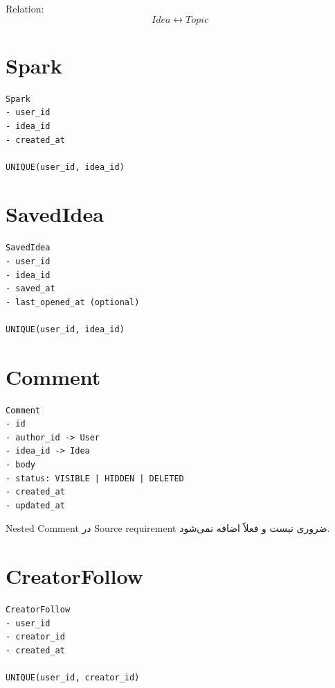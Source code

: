 Relation:
\[
Idea \leftrightarrow Topic
\]

\section{Spark}

\begin{latin}
\begin{lstlisting}
Spark
- user_id
- idea_id
- created_at

UNIQUE(user_id, idea_id)
\end{lstlisting}
\end{latin}

\section{SavedIdea}

\begin{latin}
\begin{lstlisting}
SavedIdea
- user_id
- idea_id
- saved_at
- last_opened_at (optional)

UNIQUE(user_id, idea_id)
\end{lstlisting}
\end{latin}

\section{Comment}

\begin{latin}
\begin{lstlisting}
Comment
- id
- author_id -> User
- idea_id -> Idea
- body
- status: VISIBLE | HIDDEN | DELETED
- created_at
- updated_at
\end{lstlisting}
\end{latin}

Nested Comment در Source requirement ضروری نیست و فعلاً اضافه نمی‌شود.

\section{CreatorFollow}

\begin{latin}
\begin{lstlisting}
CreatorFollow
- user_id
- creator_id
- created_at

UNIQUE(user_id, creator_id)
\end{lstlisting}
\end{latin}

